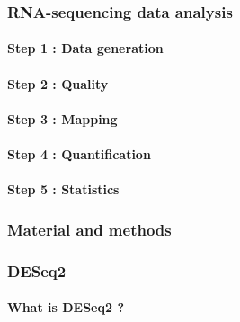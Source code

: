 \documentclass[
]{article}
\begin{document}
\hypertarget{rna-sequencing-data-analysis}{%
\subsubsection{RNA-sequencing data
analysis}\label{rna-sequencing-data-analysis}}

\hypertarget{step-1-data-generation}{%
\paragraph{Step 1 : Data generation}\label{step-1-data-generation}}

\hypertarget{step-2-quality}{%
\paragraph{Step 2 : Quality}\label{step-2-quality}}

\hypertarget{step-3-mapping}{%
\paragraph{Step 3 : Mapping}\label{step-3-mapping}}

\hypertarget{step-4-quantification}{%
\paragraph{Step 4 : Quantification}\label{step-4-quantification}}

\hypertarget{step-5-statistics}{%
\paragraph{Step 5 : Statistics}\label{step-5-statistics}}

\hypertarget{material-and-methods}{%
\subsubsection{Material and methods}\label{material-and-methods}}

\hypertarget{deseq2}{%
\subsubsection{DESeq2}\label{deseq2}}

\hypertarget{what-is-deseq2}{%
\paragraph{What is DESeq2 ?}\label{what-is-deseq2}}
\end{document}

